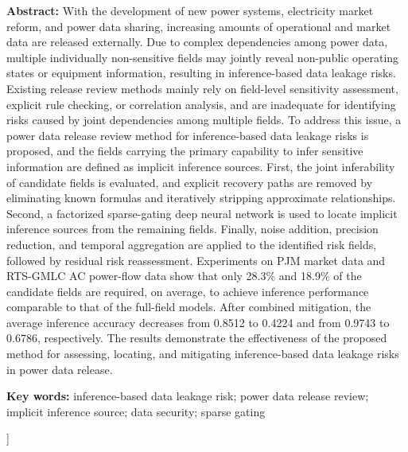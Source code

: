 \documentclass[UTF8,zihao=5,twoside,fontset=none]{ctexart}
\begin{document}
\noindent\textbf{Abstract:} With the development of new power systems, electricity market reform, and power data sharing, increasing amounts of operational and market data are released externally. Due to complex dependencies among power data, multiple individually non-sensitive fields may jointly reveal non-public operating states or equipment information, resulting in inference-based data leakage risks. Existing release review methods mainly rely on field-level sensitivity assessment, explicit rule checking, or correlation analysis, and are inadequate for identifying risks caused by joint dependencies among multiple fields. To address this issue, a power data release review method for inference-based data leakage risks is proposed, and the fields carrying the primary capability to infer sensitive information are defined as implicit inference sources. First, the joint inferability of candidate fields is evaluated, and explicit recovery paths are removed by eliminating known formulas and iteratively stripping approximate relationships. Second, a factorized sparse-gating deep neural network is used to locate implicit inference sources from the remaining fields. Finally, noise addition, precision reduction, and temporal aggregation are applied to the identified risk fields, followed by residual risk reassessment. Experiments on PJM market data and RTS-GMLC AC power-flow data show that only 28.3\% and 18.9\% of the candidate fields are required, on average, to achieve inference performance comparable to that of the full-field models. After combined mitigation, the average inference accuracy decreases from 0.8512 to 0.4224 and from 0.9743 to 0.6786, respectively. The results demonstrate the effectiveness of the proposed method for assessing, locating, and mitigating inference-based data leakage risks in power data release.\par
\noindent\textbf{Key words:} inference-based data leakage risk; power data release review; implicit inference source; data security; sparse gating\par\vspace{0.8em}

\vspace{0.8em}
]
\end{document}
